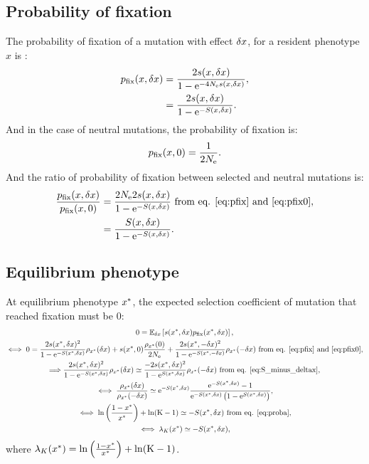 \documentclass{article}
\begin{document}
\subsection{Probability of fixation}
The probability of fixation of a mutation with effect $\delta x$, for a resident phenotype $x$ is :
\begin{align}
p_{\text{fix}}(x, \delta x) &= \frac{ 2 s(x, \delta x)}{1 - \mathrm{e}^{-4N_{\mathrm{e}} s(x, \delta x)}}, \\
 &= \frac{ 2 s(x, \delta x)}{1 - \mathrm{e}^{-S(x, \delta x)}}. \label{eq:pfix}
\end{align}
And in the case of neutral mutations, the probability of fixation is:
\begin{gather}
p_{\text{fix}}(x, 0) = \frac{ 1}{2 N_{\mathrm{e}}} \label{eq:pfix0}.
\end{gather}
And the ratio of probability of fixation between selected and neutral mutations is:
\begin{align}
\frac{p_{\text{fix}}(x, \delta x)}{p_{\text{fix}}(x, 0)} & = \frac{ 2 N_{\mathrm{e}} 2 s(x, \delta x)}{1 - \mathrm{e}^{-S(x, \delta x)}} \text{ from eq. \ref{eq:pfix} and \ref{eq:pfix0}},\\
& = \frac{S(x, \delta x)}{1 - \mathrm{e}^{-S(x, \delta x)}} \label{eq:pfixratio}.
\end{align}
\subsection{Equilibrium phenotype}
At equilibrium phenotype $x^{*}$, the expected selection coefficient of mutation that reached fixation must be $0$:
\begin{gather}
 0 = \operatorname{\mathbb{E}}_{\delta x} \left[ s(x^{*}, \delta x) p_{\text{fix}}(x^{*}, \delta x) \right], \\
\iff 0 = \frac{ 2 s(x^{*}, \delta x)^2}{1 - \mathrm{e}^{-S(x^{*}, \delta x)}}   \rho_{x^{*}}(\delta x) + s(x^{*}, 0) \frac{ \rho_{x^{*}}(0)}{2N_{\mathrm{e}}} + \frac{ 2s(x^{*}, -\delta x)^2}{1 - \mathrm{e}^{-S(x^{*}, -\delta x)}} \rho_{x^{*}}(-\delta x)\text{ from eq. \ref{eq:pfix} and \ref{eq:pfix0}}, \\
\Longrightarrow \frac{ 2s(x^{*}, \delta x)^2}{1 - \mathrm{e}^{-S(x^{*}, \delta x)}}   \rho_{x^{*}}(\delta x) \simeq \frac{ - 2s(x^{*}, \delta x)^2}{1 - \mathrm{e}^{S(x^{*}, \delta x)}}   \rho_{x^{*}}(-\delta x) \text{ from eq. \ref{eq:S_minus_deltax}}, \\
\iff \frac{ \rho_{x^{*}}(\delta x)}{\rho_{x^{*}}(-\delta x)} \simeq \mathrm{e}^{-S(x^{*}, \delta x)} \frac{ \mathrm{e}^{-S(x^{*}, \delta x)} - 1}{ \mathrm{e}^{-S(x^{*}, \delta x)} \left( 1 - \mathrm{e}^{S(x^{*}, \delta x)} \right)}, \\
\iff \ln \left( \frac{1 - x^{*}}{x^{*}} \right) + \ln (\text{K}-1) \simeq -S(x^{*}, \delta x) \text{ from eq. \ref{eq:proba}} \label{eq:equilibrium}, \\
\iff \lambda_{K}(x^{*}) \simeq -S(x^{*}, \delta x) \label{eq:equilibrium_lambda},
\end{gather}
where  $\lambda_{K}(x^{*}) = \ln \left( \frac{1 - x^{*}}{x^{*}} \right) + \ln (\text{K}-1)$.
\end{document}
